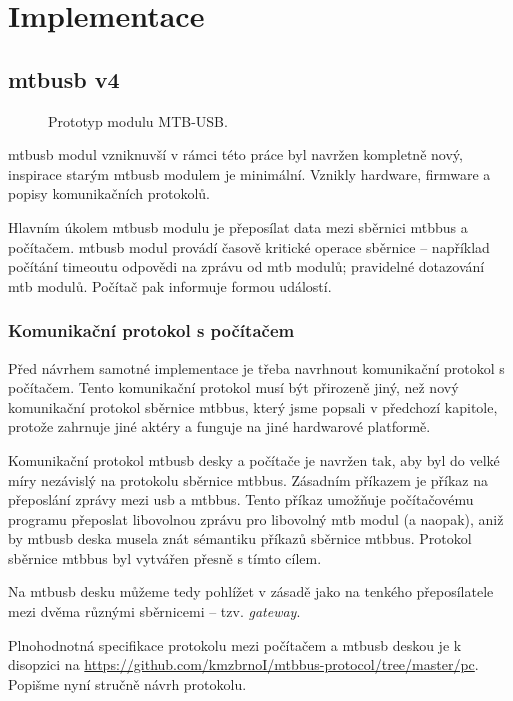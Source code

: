 \section{Implementace}

\subsection{\gls{mtbusb} v4}

\begin{figure}[ht]
\caption{Prototyp modulu MTB-USB.}
\label{fig:mtbusb-prototype}
\end{figure}

\gls{mtbusb} modul vzniknuvší v rámci této práce byl navržen kompletně nový,
inspirace starým \gls{mtbusb} modulem je minimální. Vznikly hardware, firmware
a popisy komunikačních protokolů.

Hlavním úkolem \gls{mtbusb} modulu je přeposílat data mezi sběrnici \gls{mtbbus}
a počítačem. \gls{mtbusb} modul provádí časově kritické operace sběrnice
 – například počítání timeoutu odpovědi na zprávu od \gls{mtb} modulů; pravidelné
dotazování \gls{mtb} modulů. Počítač pak informuje formou událostí.

\subsubsection{Komunikační protokol s počítačem}

Před návrhem samotné implementace je třeba navrhnout komunikační protokol
s počítačem. Tento komunikační protokol musí být přirozeně jiný, než nový
komunikační protokol sběrnice \gls{mtbbus}, který jsme popsali v předchozí
kapitole, protože zahrnuje jiné aktéry a funguje na jiné hardwarové platformě.

Komunikační protokol \gls{mtbusb} desky a počítače je navržen tak, aby byl do
velké míry nezávislý na protokolu sběrnice \gls{mtbbus}. Zásadním příkazem
je příkaz na přeposlání zprávy mezi \gls{usb} a \gls{mtbbus}. Tento příkaz umožňuje
počítačovému programu přeposlat libovolnou zprávu pro libovolný \gls{mtb} modul
(a naopak), aniž by \gls{mtbusb} deska musela znát sémantiku příkazů sběrnice
\gls{mtbbus}. Protokol sběrnice \gls{mtbbus} byl vytvářen přesně s tímto
cílem.

Na \gls{mtbusb} desku můžeme tedy pohlížet v zásadě jako na tenkého
přeposílatele mezi dvěma různými sběrnicemi – tzv. \textit{gateway}.

Plnohodnotná specifikace protokolu mezi počítačem a \gls{mtbusb} deskou je
k disopzici na \url{https://github.com/kmzbrnoI/mtbbus-protocol/tree/master/pc}.
Popišme nyní stručně návrh protokolu.

